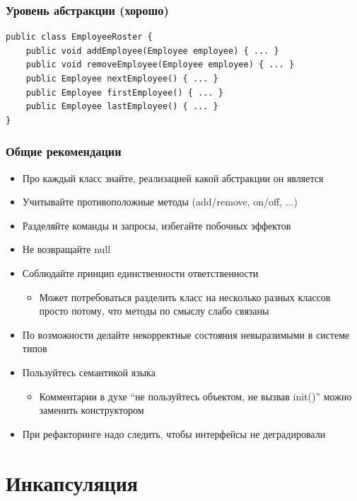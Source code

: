 \documentclass[xetex,mathserif,serif]{beamer}
\begin{document}
	\begin{frame}[fragile]
		\frametitle{Уровень абстракции (хорошо)}
		\begin{verbatim}
public class EmployeeRoster {
    public void addEmployee(Employee employee) { ... }
    public void removeEmployee(Employee employee) { ... }
    public Employee nextEmployee() { ... }
    public Employee firstEmployee() { ... }
    public Employee lastEmployee() { ... }
}
		\end{verbatim}
	\end{frame}

	\begin{frame}
		\frametitle{Общие рекомендации}
		\begin{itemize}
			\item Про каждый класс знайте, реализацией какой абстракции он является
			\item Учитывайте противоположные методы (add/remove, on/off, ...)
			\item Разделяйте команды и запросы, избегайте побочных эффектов
			\item Не возвращайте null
			\item Соблюдайте принцип единственности ответственности
			\begin{itemize}
				\item Может потребоваться разделить класс на несколько разных классов просто потому, что методы по смыслу слабо связаны
			\end{itemize}
			\item По возможности делайте некорректные состояния невыразимыми в системе типов
			\item Пользуйтесь семантикой языка
			\begin{itemize}
				\item Комментарии в духе ``не пользуйтесь объектом, не вызвав  init()'' можно заменить конструктором
			\end{itemize}
			\item При рефакторинге надо следить, чтобы интерфейсы не деградировали
		\end{itemize}
	\end{frame}

	\section{Инкапсуляция}
\end{document}
